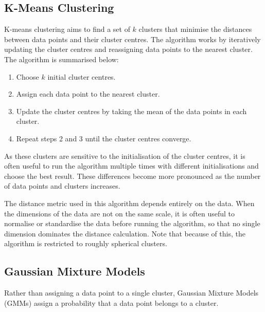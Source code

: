 \documentclass{article}
\begin{document}
\subsection{K-Means Clustering}
K-means clustering aims to find a set of \(k\) clusters that minimise
the distances between data points and their cluster centres. The
algorithm works by iteratively updating the cluster centres and
reassigning data points to the nearest cluster. The algorithm is
summarised below:
\begin{enumerate}
    \item Choose \(k\) initial cluster centres.
    \item Assign each data point to the nearest cluster.
    \item Update the cluster centres by taking the mean of the data
          points in each cluster.
    \item Repeat steps 2 and 3 until the cluster centres converge.
\end{enumerate}
As these clusters are sensitive to the initialisation of the cluster
centres, it is often useful to run the algorithm multiple times with
different initialisations and choose the best result. These differences
become more pronounced as the number of data points and clusters
increases.

The distance metric used in this algorithm depends entirely on the
data. When the dimensions of the data are not on the same scale, it is
often useful to normalise or standardise the data before running the
algorithm, so that no single dimension dominates the distance
calculation. Note that because of this, the algorithm is restricted to
roughly spherical clusters.
\subsection{Gaussian Mixture Models}
Rather than assigning a data point to a single cluster, Gaussian
Mixture Models (GMMs) assign a probability that a data point belongs to
a cluster.
\end{document}
